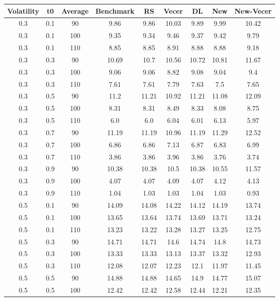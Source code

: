 \documentclass{article}
\begin{document}
\begin{table}[H]
  \begin{tabular}{|c|c|c|c|c|c|c|c|c|}
  \hline
  Volatility & t0 & Average & Benchmark & RS & Vecer & DL & New & New-Vecer \\
  \hline
  0.3 & 0.1 & 90 & 9.86 & 9.86 & 10.03 & 9.89 & 9.99 & 10.42 \\
  0.3 & 0.1 & 100 & 9.35 & 9.34 & 9.46 & 9.37 & 9.42 & 9.79 \\
  0.3 & 0.1 & 110 & 8.85 & 8.85 & 8.91 & 8.88 & 8.88 & 9.18 \\
  0.3 & 0.3 & 90 & 10.69 & 10.7 & 10.56 & 10.72 & 10.81 & 11.67 \\
  0.3 & 0.3 & 100 & 9.06 & 9.06 & 8.82 & 9.08 & 9.04 & 9.4 \\
  0.3 & 0.3 & 110 & 7.61 & 7.61 & 7.79 & 7.63 & 7.5 & 7.65 \\
  0.3 & 0.5 & 90 & 11.2 & 11.21 & 10.92 & 11.21 & 11.08 & 12.09 \\
  0.3 & 0.5 & 100 & 8.31 & 8.31 & 8.49 & 8.33 & 8.08 & 8.75 \\
  0.3 & 0.5 & 110 & 6.0 & 6.0 & 6.04 & 6.01 & 6.13 & 5.97 \\
  0.3 & 0.7 & 90 & 11.19 & 11.19 & 10.96 & 11.19 & 11.29 & 12.52 \\
  0.3 & 0.7 & 100 & 6.86 & 6.86 & 7.13 & 6.87 & 6.83 & 6.99 \\
  0.3 & 0.7 & 110 & 3.86 & 3.86 & 3.96 & 3.86 & 3.76 & 3.74 \\
  0.3 & 0.9 & 90 & 10.38 & 10.38 & 10.5 & 10.38 & 10.55 & 11.57 \\
  0.3 & 0.9 & 100 & 4.07 & 4.07 & 4.09 & 4.07 & 4.12 & 4.13 \\
  0.3 & 0.9 & 110 & 1.04 & 1.03 & 1.03 & 1.04 & 1.03 & 0.93 \\
  0.5 & 0.1 & 90 & 14.09 & 14.08 & 14.22 & 14.12 & 14.19 & 13.74 \\
  0.5 & 0.1 & 100 & 13.65 & 13.64 & 13.74 & 13.69 & 13.71 & 13.24 \\
  0.5 & 0.1 & 110 & 13.23 & 13.22 & 13.28 & 13.27 & 13.25 & 12.75 \\
  0.5 & 0.3 & 90 & 14.71 & 14.71 & 14.6 & 14.74 & 14.8 & 14.73 \\
  0.5 & 0.3 & 100 & 13.33 & 13.33 & 13.13 & 13.37 & 13.32 & 12.93 \\
  0.5 & 0.3 & 110 & 12.08 & 12.07 & 12.23 & 12.1 & 11.97 & 11.45 \\
  0.5 & 0.5 & 90 & 14.88 & 14.88 & 14.65 & 14.9 & 14.77 & 15.07 \\
  0.5 & 0.5 & 100 & 12.42 & 12.42 & 12.58 & 12.44 & 12.21 & 12.35 \\

\end{tabular}
\end{table}
\end{document}
